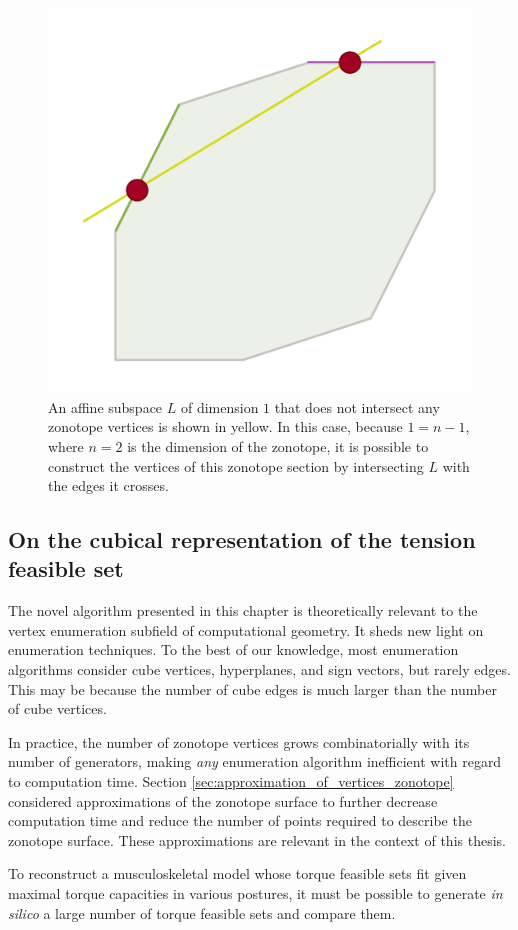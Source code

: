 \begin{figure}[!htb]
  \captionsetup{justification=centering}
  \centering
  \includegraphics[trim={0 0 0 0},clip, width=0.4\linewidth]{img/chapter_2/polytope_section_zono.pdf}
  \caption{An affine subspace $L$ of dimension $1$ that does not intersect any zonotope vertices is shown in yellow. In this case, because $1 = n-1$, where $n=2$ is the dimension of the zonotope, it is possible to construct the vertices of this zonotope section by intersecting $L$ with the edges it crosses.}
  \label{fig:zonotope_section_2D_example}
\end{figure}

\subsection*{On the cubical representation of the tension feasible set}
The novel algorithm presented in this chapter is theoretically relevant to the vertex enumeration subfield of computational geometry. It sheds new light on enumeration techniques. To the best of our knowledge, most enumeration algorithms consider cube vertices, hyperplanes, and sign vectors, but rarely edges. This may be because the number of cube edges is much larger than the number of cube vertices.

In practice, the number of zonotope vertices grows combinatorially with its number of generators, making \emph{any} enumeration algorithm inefficient with regard to computation time. Section \ref{sec:approximation_of_vertices_zonotope} considered approximations of the zonotope surface to further decrease computation time and reduce the number of points required to describe the zonotope surface. These approximations are relevant in the context of this thesis. 

To reconstruct a musculoskeletal model whose torque feasible sets fit given maximal torque capacities in various postures, it must be possible to generate \emph{in silico} a large number of torque feasible sets and compare them.

